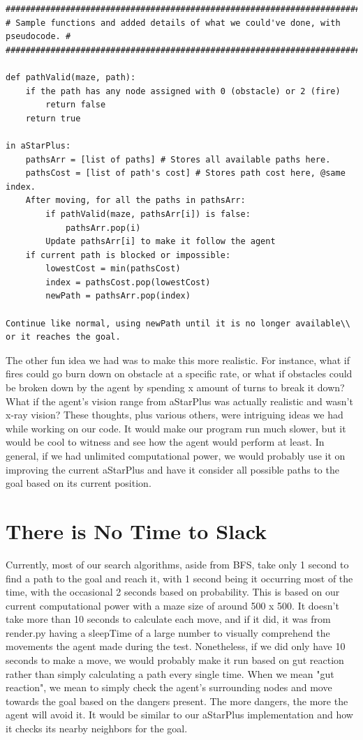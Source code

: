 \documentclass[11pt]{article}
\begin{document}
\begin{verbatim}
#################################################################################
# Sample functions and added details of what we could've done, with pseudocode. #
#################################################################################

def pathValid(maze, path):
    if the path has any node assigned with 0 (obstacle) or 2 (fire)
        return false
    return true

in aStarPlus:
    pathsArr = [list of paths] # Stores all available paths here.
    pathsCost = [list of path's cost] # Stores path cost here, @same index.
    After moving, for all the paths in pathsArr:
        if pathValid(maze, pathsArr[i]) is false:
            pathsArr.pop(i)
        Update pathsArr[i] to make it follow the agent
    if current path is blocked or impossible:
        lowestCost = min(pathsCost)
        index = pathsCost.pop(lowestCost)
        newPath = pathsArr.pop(index)
        
Continue like normal, using newPath until it is no longer available\\
or it reaches the goal.
\end{verbatim}
The other fun idea we had was to make this more realistic. For instance, what if fires could go burn down on obstacle at a specific rate, or what if obstacles could be broken down by the agent by spending x amount of turns to break it down? What if the agent's vision range from aStarPlus was actually realistic and wasn't x-ray vision? These thoughts, plus various others, were intriguing ideas we had while working on our code. It would make our program run much slower, but it would be cool to witness and see how the agent would perform at least.
In general, if we had unlimited computational power, we would probably use it on improving the current aStarPlus and have it consider all possible paths to the goal based on its current position.
\section{There is No Time to Slack}
Currently, most of our search algorithms, aside from BFS, take only 1 second to find a path to the goal and reach it, with 1 second being it occurring most of the time, with the occasional 2 seconds based on probability. This is based on our current computational power with a maze size of around 500 x 500. It doesn't take more than 10 seconds to calculate each move, and if it did, it was from render.py having a sleepTime of a large number to visually comprehend the movements the agent made during the test.
Nonetheless, if we did only have 10 seconds to make a move, we would probably make it run based on gut reaction rather than simply calculating a path every single time. When we mean "gut reaction", we mean to simply check the agent's surrounding nodes and move towards the goal based on the dangers present. The more dangers, the more the agent will avoid it. It would be similar to our aStarPlus implementation and how it checks its nearby neighbors for the goal.
\end{document}
